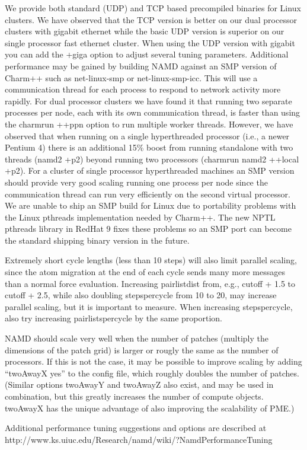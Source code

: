 We provide both standard (UDP) and TCP based precompiled binaries
for Linux clusters.  We have observed that the TCP version is better
on our dual processor clusters with gigabit ethernet while the basic
UDP version is superior on our single processor fast ethernet cluster.
When using the UDP version with gigabit you can add the +giga option
to adjust several tuning parameters.  Additional performance may be
gained by building NAMD against an SMP version of Charm++ such as
net-linux-smp or net-linux-smp-icc.  This will use a communication
thread for each process to respond to network activity more rapidly.
For dual processor clusters we have found it that running two separate
processes per node, each with its own communication thread, is faster
than using the charmrun ++ppn option to run multiple worker threads.
However, we have observed that when running on a single hyperthreaded
processor (i.e., a newer Pentium 4) there is an additional 15\% boost
from running standalone with two threads (namd2 +p2) beyond running
two processors (charmrun namd2 ++local +p2).  For a cluster of single
processor hyperthreaded machines an SMP version should provide very
good scaling running one process per node since the communication
thread can run very efficiently on the second virtual processor.  We
are unable to ship an SMP build for Linux due to portability problems
with the Linux pthreads implementation needed by Charm++.  The new
NPTL pthreads library in RedHat 9 fixes these problems so an SMP port
can become the standard shipping binary version in the future.

Extremely short cycle lengths (less than 10 steps) will also limit
parallel scaling, since the atom migration at the end of each cycle
sends many more messages than a normal force evaluation.  Increasing
pairlistdist from, e.g., cutoff + 1.5 to cutoff + 2.5, while also
doubling stepspercycle from 10 to 20, may increase parallel scaling,
but it is important to measure.  When increasing stepspercycle, also
try increasing pairlistspercycle by the same proportion.

NAMD should scale very well when the number of patches (multiply the
dimensions of the patch grid) is larger or rougly the same as the
number of processors.  If this is not the case, it may be possible
to improve scaling by adding ``twoAwayX yes'' to the config file,
which roughly doubles the number of patches.  (Similar options
twoAwayY and twoAwayZ also exist, and may be used in combination,
but this greatly increases the number of compute objects.  twoAwayX
has the unique advantage of also improving the scalability of PME.)
  

Additional performance tuning suggestions and options are described
at http://www.ks.uiuc.edu/Research/namd/wiki/?NamdPerformanceTuning

